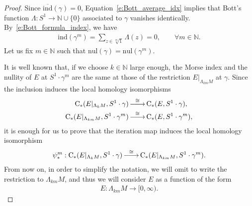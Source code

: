 \documentclass[reqno]{amsart}
\numberwithin{equation}{section}
\theoremstyle{personal}%
\theoremstyle{definition}
\newcommand{\N}{\mathds{N}}
\newcommand{\Loc}{\mathrm{C}}
\newcommand{\avind}{\overline{\ind}}
\newcommand{\ind}{\mathrm{ind}}
\newcommand{\nul}{\mathrm{nul}}
\DeclareRobustCommand{\llongrightarrow}{\relbar\joinrel\relbar\joinrel\rightarrow}
\DeclareMathOperator*{\ttoup}{\llongrightarrow}
\begin{document}
\begin{proof}
Since $\avind(\gamma)=0$, Equation~\eqref{e:Bott_average_idx} implies that Bott's function $\Lambda:S^1\to\N\cup\{0\}$ associated to $\gamma$ vanishes identically. By~\eqref{e:Bott_formula_index}, we have
\begin{align}
\label{e:zero_indices}
\ind(\gamma^m)=\sum_{z\in\!\sqrt[m]1} \Lambda(z)=0,\qquad\forall m\in\N.
\end{align}
Let us fix $m\in\N$ such that $\nul(\gamma)=\nul(\gamma^m)$. 


It is well known that, if we choose $k\in\N$ large enough, the Morse index and the nullity of $E$ at $S^1\cdot\gamma^{m}$ are the same at those of the restriction $E|_{\Lambda_{km}M}$ at $\gamma$. Since the inclusion induces the local homology isomorphisms
\begin{align*}
\Loc_*(E|_{\Lambda_{k}M},S^1\cdot\gamma)
& \ttoup^{\cong}
\Loc_*(E,S^1\cdot\gamma),
\\
\Loc_*(E|_{\Lambda_{km}M},S^1\cdot\gamma^m)
& \ttoup^{\cong}
\Loc_*(E,S^1\cdot\gamma^m),
\end{align*}
it is enough for us to prove that the iteration map induces the local homology isomorphism
\begin{align*}
\psi^m_*:
\Loc_*(E|_{\Lambda_{k}M},S^1\cdot\gamma)
 \ttoup^{\cong}
 \Loc_*(E|_{\Lambda_{km}M},S^1\cdot\gamma^m).
\end{align*}
From now on, in order to simplify the notation, we will omit to write the restriction to $\Lambda_{km}M$, and thus we will consider $E$ as a function of the form
\begin{align*}
 E:\Lambda_{km}M\to[0,\infty).
\end{align*}



\end{proof}
\end{document}
